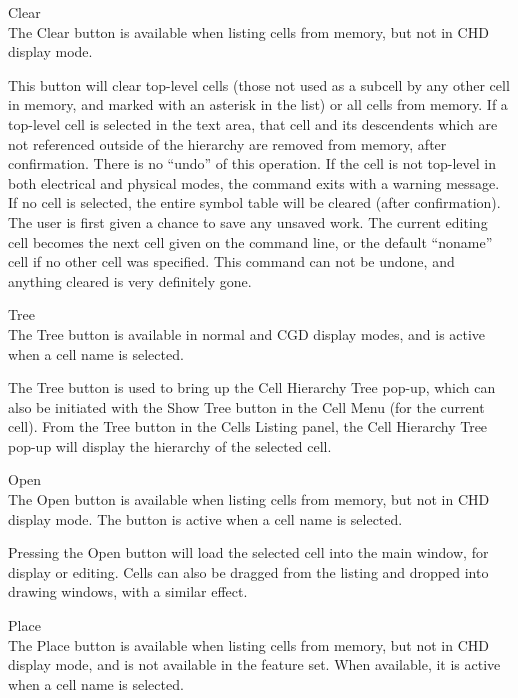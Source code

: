 \begin{description}
\item{\cb Clear}\\
The {\cb Clear} button is available when listing cells from memory,
but not in CHD display mode.

This button will clear top-level cells (those not used as a subcell by
any other cell in memory, and marked with an asterisk in the list) or
all cells from memory.  If a top-level cell is selected in the text
area, that cell and its descendents which are not referenced outside
of the hierarchy are removed from memory, after confirmation.  There
is no ``undo'' of this operation.  If the cell is not top-level in
both electrical and physical modes, the command exits with a warning
message.  If no cell is selected, the entire symbol table will be
cleared (after confirmation).  The user is first given a chance to
save any unsaved work.  The current editing cell becomes the next cell
given on the command line, or the default ``{\vt noname}'' cell if no
other cell was specified.  This command can not be undone, and
anything cleared is very definitely gone.

\item{\cb Tree}\\
The {\cb Tree} button is available in normal and CGD display modes,
and is active when a cell name is selected.

The {\cb Tree} button is used to bring up the {\cb Cell Hierarchy
Tree} pop-up, which can also be initiated with the {\cb Show Tree}
button in the {\cb Cell Menu} (for the current cell).  From the {\cb
Tree} button in the {\cb Cells Listing} panel, the {\cb Cell Hierarchy
Tree} pop-up will display the hierarchy of the selected cell.

\item{\cb Open}\\
The {\cb Open} button is available when listing cells from memory, but
not in CHD display mode.  The button is active when a cell name is
selected.

Pressing the {\cb Open} button will load the selected cell into the
main window, for display or editing.  Cells can also be dragged from
the listing and dropped into drawing windows, with a similar effect.

\item{\cb Place}\\
The {\cb Place} button is available when listing cells from memory,
but not in CHD display mode, and is not available in the {\Xiv}
feature set.  When available, it is active when a cell name is
selected.


\end{description}
